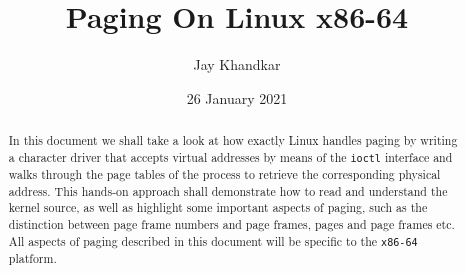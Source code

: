 \documentclass[a4paper,10pt]{article}
\title{Paging On Linux x86-64}
\author{Jay Khandkar}
\date{26 January 2021}
\begin{document}
\maketitle

\begin{abstract}
In this document we shall take a look at how exactly Linux handles paging by writing a character driver that accepts virtual
addresses by means of the \verb|ioctl| interface and walks through the page tables of the process to retrieve the corresponding physical address.
This hands-on approach shall demonstrate how to read and understand the kernel source, as well as highlight some important aspects of paging, such as the distinction between page frame numbers and page frames, pages and page frames etc. All aspects of paging described in this document will be specific to the \verb|x86-64| platform.
\end{abstract}
\end{document}
